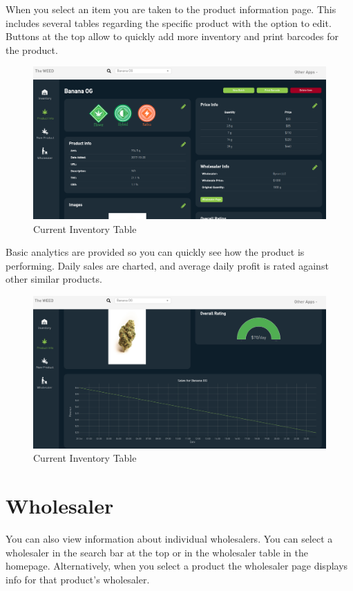 \documentclass[]{book}
\theoremstyle{definition}
\theoremstyle{definition}
\theoremstyle{definition}
\theoremstyle{remark}
\begin{document}
When you select an item you are taken to the product information page.
This includes several tables regarding the specific product with the
option to edit. Buttons at the top allow to quickly add more inventory
and print barcodes for the product.

\begin{figure}
\centering
\includegraphics{images/productInfo.png}
\caption{Current Inventory Table}
\end{figure}

Basic analytics are provided so you can quickly see how the product is
performing. Daily sales are charted, and average daily profit is rated
against other similar products.

\begin{figure}
\centering
\includegraphics{images/productInfo2.png}
\caption{Current Inventory Table}
\end{figure}

\section{Wholesaler}\label{wholesaler}

You can also view information about individual wholesalers. You can
select a wholesaler in the search bar at the top or in the wholesaler
table in the homepage. Alternatively, when you select a product the
wholesaler page displays info for that product's wholesaler.
\end{document}
